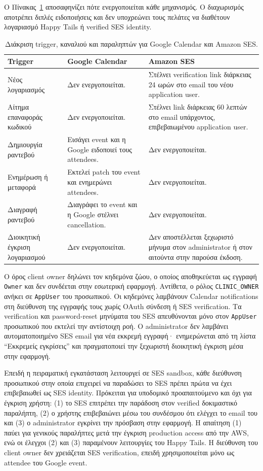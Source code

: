 Ο Πίνακας~\ref{tab:external-notification-triggers} αποσαφηνίζει πότε
ενεργοποιείται κάθε μηχανισμός. Ο διαχωρισμός αποτρέπει διπλές ειδοποιήσεις
και δεν υποχρεώνει τους πελάτες να διαθέτουν λογαριασμό Happy Tails ή verified
SES identity.

\begin{table}[htbp]
\centering
\caption{Διάκριση trigger, καναλιού και παραληπτών για Google Calendar και
Amazon SES.}
\label{tab:external-notification-triggers}
\small
\begin{tabularx}{\textwidth}{p{} X X}
\toprule
\textbf{Trigger} & \textbf{Google Calendar} & \textbf{Amazon SES} \\
\midrule
Νέος λογαριασμός & Δεν ενεργοποιείται. & Στέλνει verification link διάρκειας
24 ωρών στο email του νέου application user. \\
Αίτημα επαναφοράς κωδικού & Δεν ενεργοποιείται. & Στέλνει link διάρκειας
60 λεπτών στο email υπάρχοντος, επιβεβαιωμένου application user. \\
Δημιουργία ραντεβού & Εισάγει event και η Google ειδοποιεί τους attendees. &
Δεν ενεργοποιείται. \\
Ενημέρωση ή μεταφορά & Εκτελεί patch του event και ενημερώνει attendees. &
Δεν ενεργοποιείται. \\
Διαγραφή ραντεβού & Διαγράφει το event και η Google στέλνει cancellation. &
Δεν ενεργοποιείται. \\
Διοικητική έγκριση λογαριασμού & Δεν ενεργοποιείται. & Δεν αποστέλλεται
ξεχωριστό μήνυμα στον administrator ή στον αιτούντα στην παρούσα έκδοση. \\
\bottomrule
\end{tabularx}
\end{table}

Ο όρος client owner δηλώνει τον κηδεμόνα ζώου, ο οποίος αποθηκεύεται ως
εγγραφή \texttt{Owner} και δεν συνδέεται στην εσωτερική εφαρμογή. Αντίθετα, ο
ρόλος \texttt{CLINIC\_OWNER} ανήκει σε \texttt{AppUser} του προσωπικού. Οι
κηδεμόνες λαμβάνουν Calendar notifications στη διεύθυνση της εγγραφής τους
χωρίς OAuth σύνδεση ή SES verification. Τα verification και password-reset
μηνύματα του SES απευθύνονται μόνο στον \texttt{AppUser} προσωπικού που
εκτελεί την αντίστοιχη ροή. Ο administrator δεν λαμβάνει αυτοματοποιημένο SES
email για νέα εκκρεμή εγγραφή· ενημερώνεται από τη λίστα
\enquote{Εκκρεμείς εγκρίσεις} και πραγματοποιεί την ξεχωριστή διοικητική
έγκριση μέσα στην εφαρμογή.

Επειδή η πειραματική εγκατάσταση λειτουργεί σε SES sandbox, κάθε διεύθυνση
προσωπικού στην οποία επιχειρεί να παραδώσει το SES πρέπει πρώτα να έχει
επιβεβαιωθεί ως SES identity. Πρόκειται για υποδομικό προαπαιτούμενο και όχι
για έγκριση χρήστη: (1) το SES επιτρέπει την παράδοση στον verified
δοκιμαστικό παραλήπτη, (2) ο χρήστης επιβεβαιώνει μέσω του συνδέσμου ότι
ελέγχει το email του και (3) ο administrator εγκρίνει την πρόσβαση στην
εφαρμογή. Η απαίτηση (1) παύει για γενικούς παραλήπτες μετά την έγκριση
production access από την AWS, ενώ οι έλεγχοι (2) και (3) παραμένουν
λειτουργίες του Happy Tails. Η διεύθυνση του client owner δεν χρειάζεται SES
verification, επειδή χρησιμοποιείται μόνο ως attendee του Google event.

